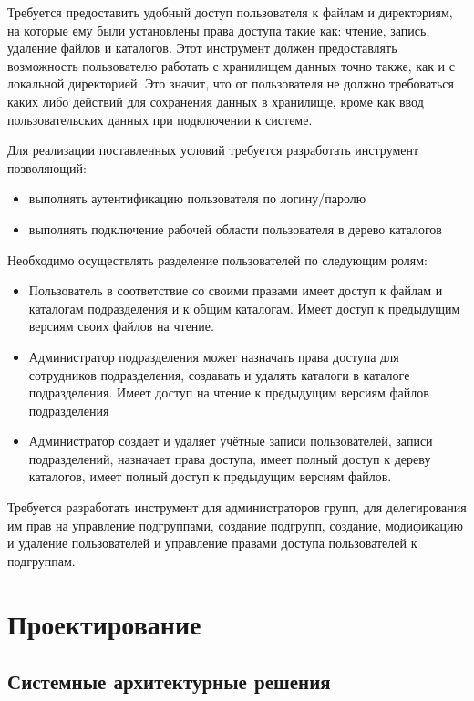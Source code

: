 \documentclass[utf8,usehyperref,12pt]{G7-32}
\begin{document}
Требуется предоставить удобный доступ пользователя к файлам и директориям, на которые ему были установлены права доступа такие как: чтение, запись, удаление файлов и каталогов. Этот инструмент должен предоставлять возможность пользователю работать с хранилищем данных точно также, как и с локальной директорией. Это значит, что от пользователя не должно требоваться каких либо действий для сохранения данных в хранилище, кроме как ввод пользовательских данных при подключении к системе.

Для реализации поставленных условий требуется разработать инструмент позволяющий:	
\begin{itemize}
\item выполнять аутентификацию пользователя по логину/паролю	
\item выполнять подключение рабочей области пользователя в дерево каталогов
\end{itemize}

Необходимо осуществлять разделение пользователей по следующим ролям:	
\begin{itemize}
\item Пользователь 	в соответствие со своими правами имеет 	доступ к файлам и каталогам подразделения и к общим каталогам. Имеет доступ к предыдущим версиям своих файлов на чтение. 		
\item Администратор подразделения может назначать права доступа для сотрудников подразделения, создавать и удалять каталоги в каталоге подразделения. Имеет доступ на чтение к предыдущим версиям файлов подразделения	
\item Администратор создает и удаляет учётные записи пользователей, записи подразделений, назначает права доступа, имеет полный 	доступ к дереву каталогов, имеет полный 	доступ к предыдущим версиям файлов.
\end{itemize}

Требуется разработать инструмент для администраторов групп, для делегирования им прав на управление подгруппами, создание подгрупп, создание, модификацию и удаление пользователей и управление правами доступа пользователей к подгруппам.

\chapter{Проектирование}
\section{Системные архитектурные решения}
\end{document}
